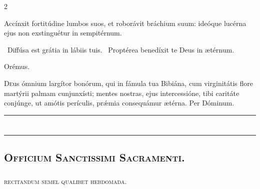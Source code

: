 \documentclass[9pt,twoside]{extarticle}
\begin{document}
\begin{multicols}{2}
\begin{tightlist}{}
\item {} Accínxit fortitúdine lumbos suos, et roborávit bráchium suum: ideóque lucérna ejus non exstinguétur in sempitérnum.
\item {}~Diffúsa est grátia in lábiis tuis. ~Proptérea benedíxit te Deus in ætérnum.
\item Orémus. \hfill {}
\end{tightlist}
\lettrine{D}eus ómnium largítor bonórum, qui in fámula tua Bibiána, cum virginitátis flore martýrii palmam cunjunxísti; mentes nostras, ejus intercessióne, tibi caritáte conjúnge, ut amótis perículis, prǽmia consequámur ætérna. Per Dóminum.

\begin{center}\textcolor{red}{\rule{\linewidth}{0.5pt}} \end{center}

\clearpage
{}
\renewcommand{\thepage}{[\arabic{page}]*}

\section*{\center \textsc{}}
\subsection*{\center \textsc{}}
\subsubsection*{\center {}}
\begin{center}\textcolor{red}{\rule{\linewidth}{0.5pt}} \end{center}

\subsection*{\center \textsc{Officium Sanctissimi Sacramenti.}}
\subsubsection*{\center {}}
\begin{center}\textsc{recitandum semel qualibet hebdomada.}\end{center}

\end{multicols}
\end{document}
